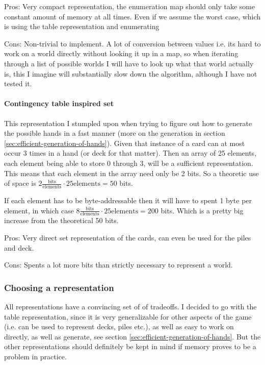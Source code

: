 Pros: Very compact representation, the enumeration map should only take some constant amount of memory at all times. Even if we assume the worst case, which is using the table representation and enumerating

Cons: Non-trivial to implement. A lot of conversion between values i.e. its hard to work on a world directly without looking it up in a map, so when iterating through a list of possible worlds I will have to look up what that world actually is, this I imagine will substantially slow down the algorithm, although I have not tested it.

\paragraph{Contingency table inspired set}
This representation I stumpled upon when trying to figure out how to generate the possible hands in a fast manner (more on the generation in section \ref{sec:efficient-generation-of-hands}).
Given that instance of a card can at most occur 3 times in a hand (or deck for that matter). Then an array of 25 elements, each element being able to store 0 through 3, will be a sufficient representation. This means that each element in the array need only be 2 bits. So a theoretic use of space is $2 \frac{\text{bits}}{\text{elements}} \cdot 25\text{elements} = 50$ bits. 

If each element has to be byte-addressable then it will have to spent 1 byte per element, in which case $8 \frac{\text{bits}}{\text{elements}} \cdot 25\text{elements} = 200$ bits. Which is a pretty big increase from the theoretical 50 bits.  

Pros: Very direct set representation of the cards, can even be used for the piles and deck. 

Cons: Spents a lot more bits than strictly necessary to represent a world.


\subsubsection{Choosing a representation}
All representations have a convincing set of of tradeoffs. I decided to go with the table representation, since it is very generalizable for other aspects of the game (i.e. can be used to represent decks, piles etc.), as well as easy to work on directly, as well as generate, see section \ref{sec:efficient-generation-of-hands}. 
But the other representations should definitely be kept in mind if memory proves to be a problem in practice.


